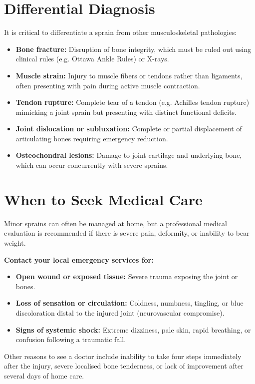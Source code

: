 \section*{Differential Diagnosis}
It is critical to differentiate a sprain from other musculoskeletal pathologies:
\begin{itemize}
    \item \textbf{Bone fracture:} Disruption of bone integrity, which must be ruled out using clinical rules (e.g. Ottawa Ankle Rules) or X-rays.
    \item \textbf{Muscle strain:} Injury to muscle fibers or tendons rather than ligaments, often presenting with pain during active muscle contraction.
    \item \textbf{Tendon rupture:} Complete tear of a tendon (e.g. Achilles tendon rupture) mimicking a joint sprain but presenting with distinct functional deficits.
    \item \textbf{Joint dislocation or subluxation:} Complete or partial displacement of articulating bones requiring emergency reduction.
    \item \textbf{Osteochondral lesions:} Damage to joint cartilage and underlying bone, which can occur concurrently with severe sprains.
\end{itemize}

\section*{When to Seek Medical Care}
Minor sprains can often be managed at home, but a professional medical evaluation is recommended if there is severe pain, deformity, or inability to bear weight.

\textbf{Contact your local emergency services for:}
\begin{itemize}
    \item \textbf{Open wound or exposed tissue:} Severe trauma exposing the joint or bones.
    \item \textbf{Loss of sensation or circulation:} Coldness, numbness, tingling, or blue discoloration distal to the injured joint (neurovascular compromise).
    \item \textbf{Signs of systemic shock:} Extreme dizziness, pale skin, rapid breathing, or confusion following a traumatic fall.
\end{itemize}
Other reasons to see a doctor include inability to take four steps immediately after the injury, severe localised bone tenderness, or lack of improvement after several days of home care.

